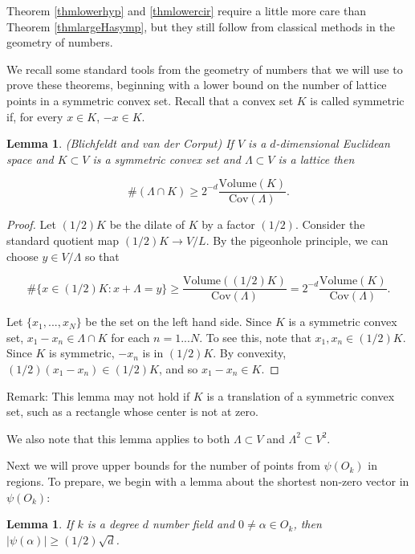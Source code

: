 \documentclass{amsart}
\newtheorem{lemma}[prop]{Lemma}
\newcommand{\Volume}{\textrm{Volume}}
\newcommand{\Cov}{\textrm{Cov}}
\begin{document}
Theorem \ref{thmlowerhyp} and \ref{thmlowercir} require a little more care than Theorem \ref{thmlargeHasymp}, but they still follow from classical methods in the geometry of numbers.  

We recall some standard tools from the geometry of numbers that we will use to prove these theorems, beginning with a lower bound on the number of lattice points in a symmetric convex set.  Recall that a convex set $K$ is called symmetric if, for every $x \in K$, $-x \in K$.  

\begin{lemma} \label{lemlower} (Blichfeldt and van der Corput) If $V$ is a $d$-dimensional Euclidean space and $K \subset V$ is a  symmetric convex set and $\Lambda \subset V$ is a lattice  then

$$ \# ( \Lambda \cap K) \ge 2^{-d} \frac{\Volume(K)}{\Cov(\Lambda)}. $$

\end{lemma}

\begin{proof} Let $(1/2) K$ be the dilate of $K$ by a factor $(1/2)$.   Consider the standard quotient map $(1/2) K \rightarrow V / L$.   By the pigeonhole principle,  we can choose $y \in V / \Lambda$ so that 

$$ \# \{ x \in (1/2) K: x + \Lambda = y \} \ge \frac{ \Volume( (1/2) K) }{\Cov(\Lambda)} = 2^{-d} \frac{\Volume(K)}{\Cov(\Lambda)}. $$

Let $\{ x_1, ..., x_N \}$ be the set on the left hand side.   Since $K$ is a symmetric convex set,  $x_1 - x_n \in \Lambda \cap K$ for each $n = 1... N$.  To see this, note that $x_1, x_n \in (1/2) K$.  Since $K$ is symmetric, $-x_n$ is in $(1/2) K$.  By convexity, $(1/2)( x_1 - x_n) \in (1/2) K$, and so $x_1 - x_n \in K$.  

\end{proof}

Remark: This lemma may not hold if $K$ is a translation of a symmetric convex set, such as a rectangle whose center is not at zero.

We also note that this lemma applies to both $\Lambda \subset V$ and $\Lambda^2 \subset V^2$.   

Next we will prove upper bounds for the number of points from $\psi(O_k)$ in regions.  To prepare, we begin with a lemma about the shortest non-zero vector in $\psi(O_k)$:

\begin{lemma} \label{lemshortvec} If $k$ is a degree $d$ number field and $0 \not= \alpha \in O_k$,  then $|\psi(\alpha)| \ge (1/2) \sqrt{d}$.
\end{lemma}
\end{document}

